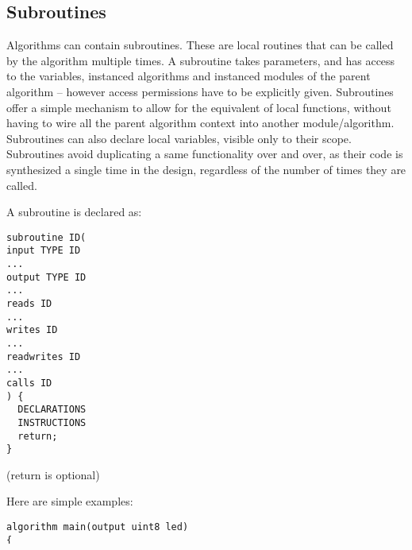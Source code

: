 \documentclass[a4]{article}
\begin{document}
\vspace*{5mm}
\noindent
{}


\subsection{Subroutines}

Algorithms can contain subroutines. These are local routines that can be called by the algorithm multiple times. A subroutine takes parameters, and has access to the variables, instanced algorithms and instanced modules of the parent algorithm -- however access permissions have to be explicitly given. 
%
Subroutines offer a simple mechanism to allow for the equivalent of local functions, without having to wire all the parent algorithm context into another module/algorithm. Subroutines can also declare local variables, visible only to their scope. Subroutines avoid duplicating a same functionality over and over, as their code is synthesized a single time in the design, regardless of the number of times they are called.

A subroutine is declared as:

\begin{verbatim}
subroutine ID(
input TYPE ID
...
output TYPE ID
...
reads ID
...
writes ID
...
readwrites ID
...
calls ID
) {
  DECLARATIONS
  INSTRUCTIONS
  return;
}
\end{verbatim}
\noindent (return is optional)

Here are simple examples:

\begin{verbatim}
algorithm main(output uint8 led)
{
  uint8  a       = 1;

  subroutine shift_led(readwrites a) {
    a = a << 1;
    if (a == 0) {
      a = 1;
    }
  }

  subroutine wait() {
    uint20 counter = 0;
    while (counter != 0) {
      counter = counter + 1;
    }
  }
    
  led := a;
  
  while(1) {
    () <- wait <- ();
    () <- shift_led <- ();
  }
}
\end{verbatim}

\noindent \textit{Subroutines permissions.} Subroutine permissions ensure only those variables given read/write
permission can be manipulated. This mitigates the fact that a subroutine may directly manipulate variables in the 
parent algorithm. The format for the permissions is a comma separated list using keywords \texttt{reads}, \texttt{writes}, \texttt{readwrites} \\
\end{document}
